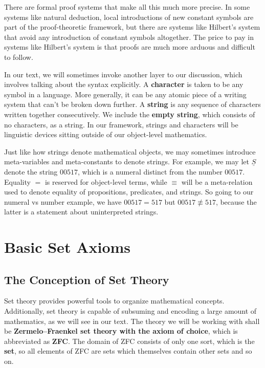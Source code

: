 There are formal proof systems that make all this much more precise.
In some systems like natural deduction, local introductions of new constant symbols are part of the proof-theoretic framework, but there are systems like Hilbert's system that avoid any introduction of constant symbols altogether.
The price to pay in systems like Hilbert's system is that proofs are much more arduous and difficult to follow. 

In our text, we will sometimes invoke another layer to our discussion, which involves talking about the syntax explicitly.
A \textbf{character} is taken to be any symbol in a language.
More generally, it can be any atomic piece of a writing system that can't be broken down further. 
A \textbf{string} is any sequence of characters written together consecutively.
We include the \textbf{empty string}, which consists of no characters, as a string. 
In our framework, strings and characters will be linguistic devices sitting outside of our object-level mathematics.

Just like how strings denote mathematical objects, we may sometimes introduce meta-variables and meta-constants to denote strings. 
For example, we may let $\underline{S}$ denote the string $00517$, which is a numeral distinct from the number $00517$. 
Equality $=$ is reserved for object-level terms, while $\equiv$ will be a meta-relation used to denote equality of propositions, predicates, and strings. 
So going to our numeral vs number example, we have $00517 = 517$ but $00517\not\equiv 517$, because the latter is a statement about uninterpreted strings. 

\section{Basic Set Axioms}\label{ch1sec_basic_set_axioms}

\subsection{The Conception of Set Theory}

Set theory provides powerful tools to organize mathematical concepts. 
Additionally, set theory is capable of subsuming and encoding a large amount of mathematics, as we will see in our text. 
The theory we will be working with shall be \textbf{Zermelo--Fraenkel set theory with the axiom of choice}, which is abbreviated as \textbf{ZFC}. 
The domain of ZFC consists of only one sort, which is the \textbf{set}, so all elements of ZFC are sets which themselves contain other sets and so on.

